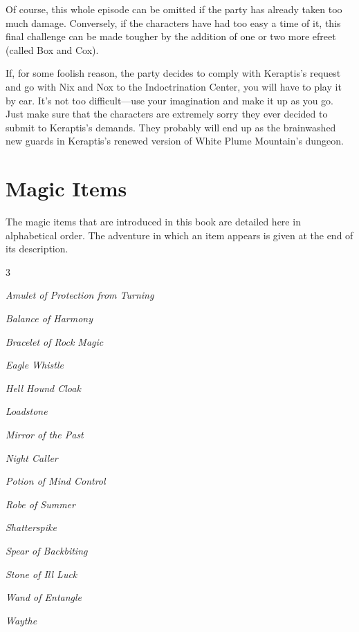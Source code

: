 \documentclass[10pt,a4paper,twoside,bg=print,twocolumn,openany,nodeprecatedcode]{dndbook}
\begin{document}
Of course, this whole episode can be omitted if the party has already taken too much damage. Conversely, if the characters have had too easy a time of it, this final challenge can be made tougher by the addition of one or two more efreet (called Box and Cox).

If, for some foolish reason, the party decides to comply with Keraptis's request and go with Nix and Nox to the Indoctrination Center, you will have to play it by ear. It's not too difficult—use your imagination and make it up as you go. Just make sure that the characters are extremely sorry they ever decided to submit to Keraptis's demands. They probably will end up as the brainwashed new guards in Keraptis's renewed version of White Plume Mountain's dungeon.

\appendix
\chapter{Magic Items}
The magic items that are introduced in this book are detailed here in alphabetical order. The adventure in which an item appears is given at the end of its description.


\begin{itemize}
\begin{multicols}{3}
\item \textit{Amulet of Protection from Turning}
\item \textit{Balance of Harmony}
\item \textit{Bracelet of Rock Magic}
\item \textit{Eagle Whistle}
\item \textit{Hell Hound Cloak}
\item \textit{Loadstone}
\item \textit{Mirror of the Past}
\item \textit{Night Caller}
\item \textit{Potion of Mind Control}
\item \textit{Robe of Summer}
\item \textit{Shatterspike}
\item \textit{Spear of Backbiting}
\item \textit{Stone of Ill Luck}
\item \textit{Wand of Entangle}
\item \textit{Waythe}
\end{multicols}

\end{itemize}
\end{document}
